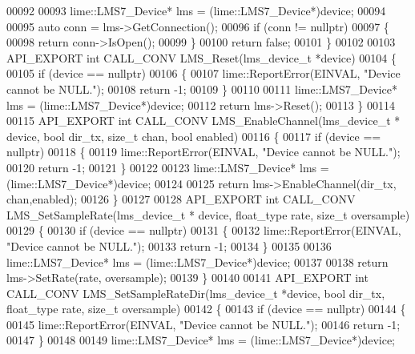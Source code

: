 \begin{DoxyCode}
00092 
00093     lime::LMS7_Device* lms = (lime::LMS7_Device*)device;
00094 
00095     \textcolor{keyword}{auto} conn = lms->GetConnection();
00096     \textcolor{keywordflow}{if} (conn != \textcolor{keyword}{nullptr})
00097     \{
00098         \textcolor{keywordflow}{return} conn->IsOpen();
00099     \}
00100     \textcolor{keywordflow}{return} \textcolor{keyword}{false};
00101 \}
00102 
00103 API_EXPORT \textcolor{keywordtype}{int} CALL_CONV LMS_Reset(lms_device_t *device)
00104 \{
00105     \textcolor{keywordflow}{if} (device == \textcolor{keyword}{nullptr})
00106     \{
00107         lime::ReportError(EINVAL, \textcolor{stringliteral}{"Device cannot be NULL."});
00108         \textcolor{keywordflow}{return} -1;
00109     \}
00110 
00111     lime::LMS7_Device* lms = (lime::LMS7_Device*)device;
00112     \textcolor{keywordflow}{return} lms->Reset();
00113 \}
00114 
00115 API_EXPORT \textcolor{keywordtype}{int} CALL_CONV LMS_EnableChannel(lms_device_t * device, \textcolor{keywordtype}{bool} dir_tx, \textcolor{keywordtype}{size\_t} 
      chan, \textcolor{keywordtype}{bool} enabled)
00116 \{
00117     \textcolor{keywordflow}{if} (device == \textcolor{keyword}{nullptr})
00118     \{
00119         lime::ReportError(EINVAL, \textcolor{stringliteral}{"Device cannot be NULL."});
00120         \textcolor{keywordflow}{return} -1;
00121     \}
00122 
00123     lime::LMS7_Device* lms = (lime::LMS7_Device*)device;
00124 
00125     \textcolor{keywordflow}{return} lms->EnableChannel(dir\_tx, chan,enabled);
00126 \}
00127 
00128 API_EXPORT \textcolor{keywordtype}{int} CALL_CONV LMS_SetSampleRate(lms_device_t * device, float_type 
      rate, \textcolor{keywordtype}{size\_t} oversample)
00129 \{
00130     \textcolor{keywordflow}{if} (device == \textcolor{keyword}{nullptr})
00131     \{
00132         lime::ReportError(EINVAL, \textcolor{stringliteral}{"Device cannot be NULL."});
00133         \textcolor{keywordflow}{return} -1;
00134     \}
00135 
00136    lime::LMS7_Device* lms = (lime::LMS7_Device*)device;
00137 
00138    \textcolor{keywordflow}{return} lms->SetRate(rate, oversample);
00139 \}
00140 
00141 API_EXPORT \textcolor{keywordtype}{int} CALL_CONV LMS_SetSampleRateDir(lms_device_t *device, \textcolor{keywordtype}{bool} dir_tx, 
      float_type rate, \textcolor{keywordtype}{size\_t} oversample)
00142 \{
00143     \textcolor{keywordflow}{if} (device == \textcolor{keyword}{nullptr})
00144     \{
00145         lime::ReportError(EINVAL, \textcolor{stringliteral}{"Device cannot be NULL."});
00146         \textcolor{keywordflow}{return} -1;
00147     \}
00148 
00149     lime::LMS7_Device* lms = (lime::LMS7_Device*)device;

\end{DoxyCode}
